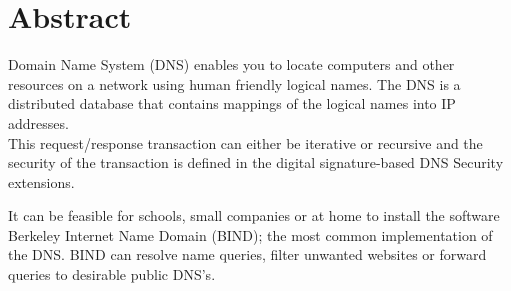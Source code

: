 \documentclass[Main]{subfiles}
\begin{document}
\chapter*{Abstract}

Domain Name System (DNS) enables you to locate computers and other resources on a network using human friendly logical names. The DNS is a distributed database that contains mappings of the logical names into IP addresses.\\This request/response transaction can either be iterative or recursive and the security of the transaction is defined in the digital signature-based DNS Security extensions.


It can be feasible for schools, small companies or at home to install the software Berkeley Internet Name Domain (BIND); the most common implementation of the DNS. BIND can resolve name queries, filter unwanted websites or forward queries to desirable public DNS's.


\setcounter{tocdepth}{1}
\tableofcontents
\end{document}
